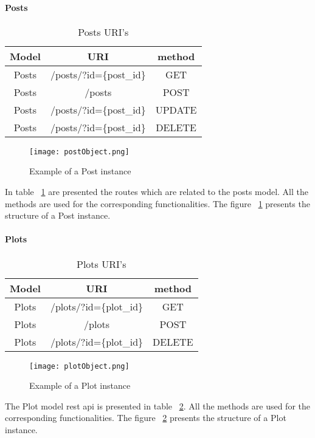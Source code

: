 \paragraph{Posts}
\begin{table}[]
\centering
\begin{tabular}{|c|c|c|}
\hline
\rowcolor[HTML]{32CB00} 
\textbf{Model} & \textbf{URI}            & \textbf{method} \\ \hline
\rowcolor[HTML]{FFFFFF} 
Posts          & /posts/?id=\{post\_id\} & GET             \\ \hline
\rowcolor[HTML]{67FD9A} 
Posts          & /posts                  & POST            \\ \hline
\rowcolor[HTML]{FFFFFF} 
Posts          & /posts/?id=\{post\_id\} & UPDATE          \\ \hline
\rowcolor[HTML]{67FD9A} 
Posts          & /posts/?id=\{post\_id\} & DELETE          \\ \hline
\end{tabular}
\caption{Posts URI's}
\label{postsURI}
\end{table}
\begin{figure}
	\centerline{\texttt{[image: postObject.png]}}
	\caption{Example of a Post instance}
	\label{postObject}
\end{figure}
In table ~\ref{postsURI} are presented the routes which are related to the posts model. All the methods are used for the corresponding functionalities. The figure ~\ref{postObject} presents the structure of a Post instance. 

\paragraph{Plots}
\begin{table}[]
\centering
\begin{tabular}{|c|c|c|}
\hline
\rowcolor[HTML]{32CB00} 
\textbf{Model} & \textbf{URI}            & \textbf{method} \\ \hline
\rowcolor[HTML]{FFFFFF} 
Plots          & /plots/?id=\{plot\_id\} & GET             \\ \hline
\rowcolor[HTML]{67FD9A} 
Plots          & /plots                  & POST            \\ \hline
\rowcolor[HTML]{FFFFFF} 
Plots          & /plots/?id=\{plot\_id\} & DELETE          \\ \hline
\end{tabular}
\caption{Plots URI's}
\label{plotsURI}
\end{table}
\begin{figure}
	\centerline{\texttt{[image: plotObject.png]}}
	\caption{Example of a Plot instance}
	\label{plotObject}
\end{figure}
The Plot model rest api is presented in table ~\ref{plotsURI}. All the methods are used for the corresponding functionalities. The figure ~\ref{plotObject} presents the structure of a Plot instance. 


